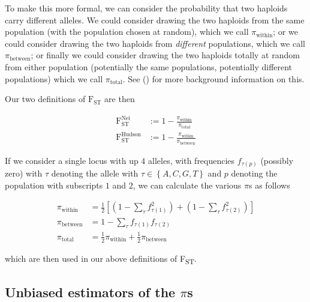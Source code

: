 \documentclass[letterpaper,fontsize=9pt,DIV=12]{scrartcl}
\newcommand\citeay[1]{\citeauthor{#1} (\citeyear{#1}) \cite{#1}}
\newcommand{\fst}{F\textsubscript{ST}}
\begin{document}
To make this more formal, we can consider the probability that two haploids carry different alleles.
We could consider drawing the two haploids from the same population (with the population chosen at random), which we call $\pi_\text{within}$; or we could consider drawing the two haploids from \emph{different} populations, which we call $\pi_\text{between}$; or finally we could consider drawing the two haploids totally at random from either population (potentially the same populations, potentially different populations) which we call $\pi_\text{total}$.
See \citeay{Bhatia2013} for more background information on this.

Our two definitions of $\text{F}_\text{ST}$ are then

\begin{align}
    \text{F}_\text{ST}^\text{Nei}    &:= 1 - \frac{\pi_\text{within}}{\pi_\text{total}} \label{eq:popnei}\\
    \text{F}_\text{ST}^\text{Hudson} &:= 1 - \frac{\pi_\text{within}}{\pi_\text{between}} \label{eq:pophudson}
\end{align}

If we consider a single locus with up $4$ alleles, with frequencies $f_{\tau(p)}$ (possibly zero) with  $\tau$ denoting the allele with $\tau \in \left\{A, C, G, T\right\}$ and $p$ denoting the population with subscripts $1$ and $2$, we can calculate the various $\pi$s as follows

\begin{align}
    \label{eq:PiDefs:PiWithin}
    \pi_\text{within} &= \frac{1}{2}\left[\left(1 - \sum_\tau f_{\tau(1)}^2\right) + \left(1 - \sum_\tau f_{\tau(2)}^2\right)\right] \\
    \label{eq:PiDefs:PiBetween}
    \pi_\text{between} &= 1 - \sum_\tau f_{\tau(1)}f_{\tau(2)} \\
    \label{eq:PiDefs:PiTotal}
    \pi_\text{total} &= \frac{1}{2}\pi_\text{within} + \frac{1}{2}\pi_\text{between}
\end{align}

which are then used in our above definitions of \fst.


\subsection{Unbiased estimators of the \texorpdfstring{$\pi$s}{pi's}}
\label{supp:sec:FST:sub:EstimatorsPi}
\end{document}
